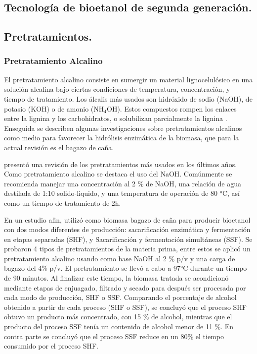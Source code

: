 \documentclass[12pt]{article}
\begin{document}
\subsection{Tecnología de bioetanol de segunda generación.}




\subsection{Pretratamientos.}









\subsubsection{Pretratamiento Alcalino}

El pretratamiento alcalino consiste en sumergir un material lignocelulósico en una solución alcalina bajo ciertas condiciones de temperatura, concentración, y tiempo de tratamiento. Los álcalis más usados son hidróxido de sodio (NaOH), de potasio (KOH) o de amonio (NH$_4$OH). Estos compuestos rompen los enlaces entre la lignina y los carbohidratos, o solubilizan parcialmente la lignina \cite{Galbe2012}.
Enseguida se describen algunas investigaciones sobre pretratamientos alcalinos como medio para favorecer la hidrólisis enzimática de la biomasa, que para la actual revisión es el bagazo de caña.

\cite{Nasution_2022} presentó una revisión de los pretratamientos más usados en los últimos años. Como pretratamiento alcalino se destaca el uso del NaOH. Comúnmente se recomienda manejar una concentración al 2 \% de NaOH, una relación de agua destilada de 1:10 solido-liquido, y una temperatura de operación de 80 °C, así como un tiempo de tratamiento de 2h.

En un estudio afin, \cite{Arturo2022evaluacion} utilizó como biomasa bagazo de caña para producir bioetanol con dos modos diferentes de producción: sacarificación enzimática y fermentación en etapas separadas (SHF), y Sacarificación y fermentación simultáneas (SSF). Se probaron 4 tipos de pretratamientos de la materia prima, entre estos se aplicó un pretratamiento alcalino usando como base NaOH al 2 \% p/v y una carga de bagazo del 4\% p/v. El pretratamiento se llevó a cabo a 97°C durante un tiempo de 90 minutos. Al finalizar este tiempo, la biomasa tratada se acondicionó mediante etapas de enjuagado, filtrado y secado para después ser procesada por cada modo de producción, SHF o SSF. Comparando el porcentaje de alcohol obtenido a partir de cada proceso (SHF o SSF), se concluyó que el proceso SHF obtuvo un producto más concentrado, con 15 \% de alcohol, mientras que el producto del proceso SSF tenía un contenido de alcohol menor de 11 \%. En contra parte se concluyó que el proceso SSF reduce en un 80\% el tiempo consumido por el proceso SHF.
\end{document}
